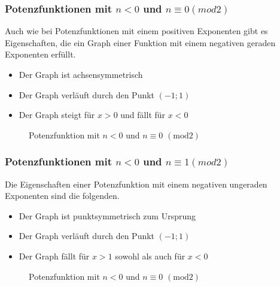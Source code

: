 \subsubsection{Potenzfunktionen mit $n<0$ und $n\equiv0(mod2)$}
Auch wie bei Potenzfunktionen mit einem positiven Exponenten gibt es Eigenschaften, die ein Graph einer Funktion mit einem negativen geraden Exponenten erfüllt.
\begin{itemize}
	\item Der Graph ist achsensymmetrisch
	\item Der Graph verläuft durch den Punkt $(-1;1)$
	\item Der Graph steigt für $x>0$ und fällt für $x<0$
\end{itemize}
\begin{figure}[h]
\centering
{}
\caption{Potenzfunktion mit $n<0$ und $ n\equiv0$ $(\mathrm{mod}2)$}
\end{figure}
\subsubsection{Potenzfunktionen mit $n<0$ und $n\equiv1(mod2)$}
Die Eigenschaften einer Potenzfunktion mit einem negativen ungeraden Exponenten sind die folgenden. 
\begin{itemize}
	\item Der Graph ist punktsymmetrisch zum Ursprung
	\item Der Graph verläuft durch den Punkt $(-1;1)$
	\item Der Graph fällt für $x>1$ sowohl als auch für $x<0$
\end{itemize}
\begin{figure}[h]
\centering
{}
\caption{Potenzfunktion mit $n<0$ und $ n\equiv0$ $(\mathrm{mod}2)$}
\end{figure}
\pagebreak
